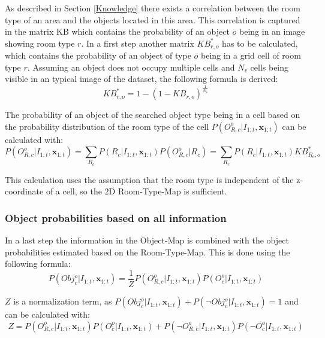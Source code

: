 As described in Section \ref{Knowledge} there exists a correlation between the room type of an area and the objects located in this area. This correlation is captured in the matrix KB which contains the probability of an object $o$ being in an image showing room type $r$. In a first step another matrix $KB_{r,o}^*$ has to be calculated, which contains the probability of an object of type $o$ being in a grid cell of room type $r$. Assuming an object does not occupy multiple cells and $N_v$ cells being visible in an typical image of the dataset, the following formula is derived: 
\begin{equation}
 KB_{r,o}^*= 1-(1-KB_{r,o})^{\frac{1}{N_v}}
\end{equation}

The probability of an object of the searched object type being in a cell based on the probability distribution of the room type of the cell $P(O_{R,c}^{o}|I_{1:t}, \mathbf{x}_{1:t})$ can be calculated with: 
\begin{equation}
 P(O_{R,c}^{o}|I_{1:t}, \mathbf{x}_{1:t})= \sum_{R_{c}}P(R_{c}|I_{1:t}, \mathbf{x}_{1:t})P(O_{R,c}^{o}|R_c)=\sum_{R_{c}}P(R_{c}|I_{1:t}, \mathbf{x}_{1:t})KB_{R_{c},o}^*
\end{equation}

This calculation uses the assumption that the room type is independent of the z-coordinate of a cell, so the 2D Room-Type-Map is sufficient.

\subsubsection{Object probabilities based on all information}

In a last step the information in the Object-Map is combined with the object probabilities estimated based on the Room-Type-Map. This is done using the following formula:
\begin{equation}
 P(Obj_{c}^{o}|I_{1:t}, \mathbf{x}_{1:t})=\frac{1}{Z}P(O_{R,c}^{o}|I_{1:t}, \mathbf{x}_{1:t})P(O_{c}^{o}|I_{1:t}, \mathbf{x}_{1:t})
\end{equation}

$Z$ is a normalization term, as $P(Obj_{c}^{o}|I_{1:t}, \mathbf{x}_{1:t}) + P(\neg Obj_{c}^{o}|I_{1:t}, \mathbf{x}_{1:t}) = 1$ and can be calculated with:
\begin{equation}
 Z=P(O_{R,c}^{o}|I_{1:t}, \mathbf{x}_{1:t})P(O_{c}^{o}|I_{1:t}, \mathbf{x}_{1:t})+P(\neg O_{R,c}^{o}|I_{1:t}, \mathbf{x}_{1:t})P(\neg O_{c}^{o}|I_{1:t}, \mathbf{x}_{1:t})
\end{equation}

